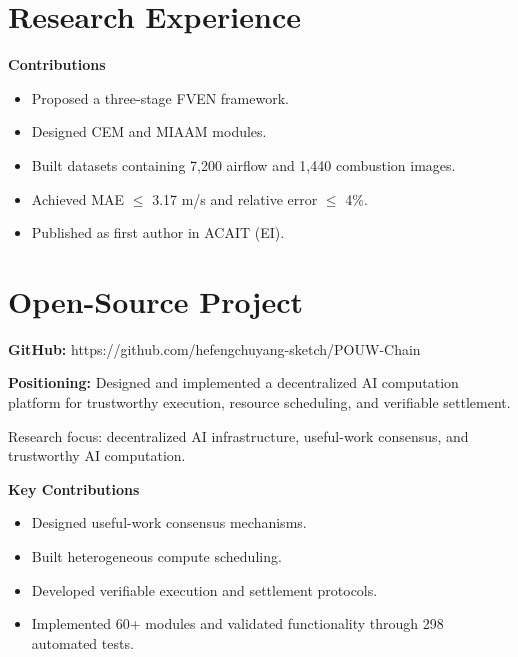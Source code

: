 \documentclass{resume}
\begin{document}
\section{Research Experience}
\textbf{Contributions}

\begin{itemize}
\item Proposed a three-stage FVEN framework.
\item Designed CEM and MIAAM modules.
\item Built datasets containing 7,200 airflow and 1,440 combustion images.
\item Achieved MAE $\leq$ 3.17 m/s and relative error $\leq$ 4\%.
\item Published as first author in ACAIT (EI).
\end{itemize}

\vspace{1pt}
\vspace{0.8\baselineskip}
\section{Open-Source Project}
\textbf{GitHub:} https://github.com/hefengchuyang-sketch/POUW-Chain

\textbf{Positioning:} Designed and implemented a decentralized AI computation platform for trustworthy execution, resource scheduling, and verifiable settlement.

Research focus: decentralized AI infrastructure, useful-work consensus, and trustworthy AI computation.

\textbf{Key Contributions}

\begin{itemize}
\item Designed useful-work consensus mechanisms.
\item Built heterogeneous compute scheduling.
\item Developed verifiable execution and settlement protocols.
\item Implemented 60+ modules and validated functionality through 298 automated tests.
\end{itemize}

\vspace{2pt}
\vspace{0.8\baselineskip}
\end{document}
